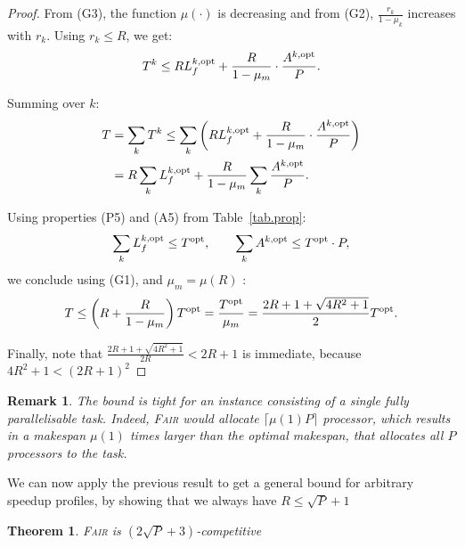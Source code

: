 \documentclass{article}
\newtheorem{remark}{Remark}
\newtheorem{theorem}{Theorem}
\newcommand\fair{\textsc{Fair}\xspace}
\newcommand\ratio{R\xspace}
\newcommand\rratio{r\xspace}
\newcommand\opt{\textnormal{opt}\xspace}
\begin{document}
\begin{proof}
From (G3), the function $\mu(\cdot)$ is decreasing and from (G2), $\frac{\rratio_k}{1 - \mu_k}$ increases with $\rratio_k$. Using $\rratio_k \leq \ratio$, we get:
\[
T^k \leq \ratio L_f^{k,\opt} + \frac{\ratio}{1 - \mu_m} \cdot \frac{A^{k,\opt}}{P}.
\]

Summing over $k$:
\begin{align*}
T &= \sum_k T^k
\leq \sum_k \left( \ratio L_f^{k,\opt} + \frac{\ratio}{1 - \mu_m} \cdot \frac{A^{k,\opt}}{P} \right) \\
&= \ratio \sum_k L_f^{k,\opt} + \frac{\ratio}{1 - \mu_m} \sum_k \frac{A^{k,\opt}}{P}.
\end{align*}

Using properties (P5) and (A5) from Table~\ref{tab.prop}:
\[
\sum_k L_f^{k,\opt} \leq T^{\opt}, \qquad \sum_k A^{k,\opt} \leq T^{\opt} \cdot P,
\]
we conclude using (G1), and $\mu_m=\mu(\ratio)$ :
\[
T \leq \left( \ratio + \frac{\ratio}{1 - \mu_m} \right) T^{\opt} = \frac{T^{\opt}}{\mu_m}= \frac{2\ratio+1+\sqrt{4\ratio^2+1}}{2} T^{\opt}.
\]

Finally, note that $\frac{2\ratio+1+\sqrt{4\ratio^2+1}}{2\ratio}<2\ratio+1$ is immediate, because $4\ratio^2+1<(2\ratio+1)^2$
\end{proof}

\begin{remark}
The bound is tight for an instance consisting of a single fully parallelisable task. Indeed, \fair would allocate $\lceil \mu(1)P \rceil$ processor, which results in a makespan $\mu(1)$ times larger than the optimal makespan, that allocates all $P$ processors to the task.
\end{remark}

We can now apply the previous result to get a general bound for arbitrary speedup profiles, by showing that we always have $\ratio \leq \sqrt{P}+1$

\begin{theorem}
\fair is $(2\sqrt{P}+3)$-competitive
\end{theorem}
\end{document}
